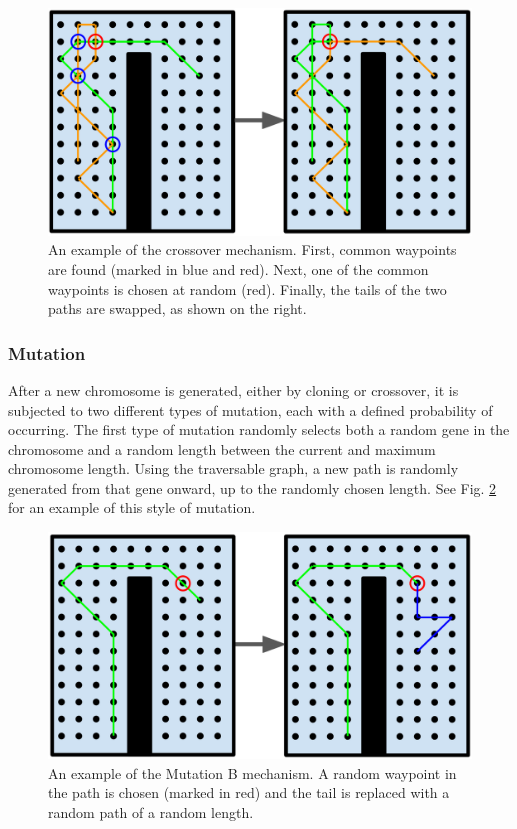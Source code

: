 \documentclass[letterpaper, 10 pt, conference]{ieeeconf}  %
\begin{document}
\begin{figure}
\centering
\includegraphics[width=0.8\linewidth]{figures/crossover.png}
\caption{An example of the crossover mechanism. First, common waypoints are found (marked in blue and red). Next, one of the common waypoints is chosen at random (red). Finally, the tails of the two paths are swapped, as shown on the right.}
\label{fig:crossover}
\end{figure}

\subsubsection{Mutation}

After a new chromosome is generated, either by cloning or crossover, it is subjected to two different types of mutation, each with a defined probability of occurring. The first type of mutation randomly selects both a random gene in the chromosome and a random length between the current and maximum chromosome length. Using the traversable graph, a new path is randomly generated from that gene onward, up to the randomly chosen length. See Fig. \ref{fig:mutation} for an example of this style of mutation.

\begin{figure}
\centering
\includegraphics[width=0.8\linewidth]{figures/mutation.png}
\caption{An example of the Mutation B mechanism. A random waypoint in the path is chosen (marked in red) and the tail is replaced with a random path of a random length.}
\label{fig:mutation}
\end{figure}
\end{document}
